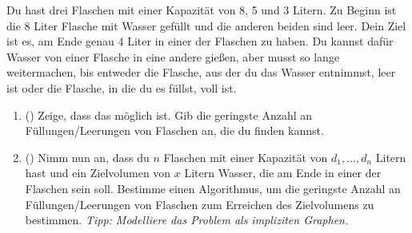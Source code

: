 \documentclass{uebung_cs}
\begin{document}
\begin{aufgabe}
Du hast drei Flaschen mit einer Kapazität von 8, 5 und 3 Litern.
Zu Beginn ist die 8 Liter Flasche mit Wasser gefüllt und die anderen beiden sind leer.
Dein Ziel ist es, am Ende genau 4 Liter in einer der Flaschen zu haben. Du kannst dafür Wasser von einer Flasche in eine andere gießen, aber musst so lange weitermachen, bis entweder die Flasche, aus der du das Wasser entnimmst, leer ist oder die Flasche, in die du es füllst, voll ist.
\begin{enumerate}
	\item (\hard) Zeige, dass das möglich ist. Gib die geringste Anzahl an Füllungen/Leerungen von Flaschen an, die du finden kannst.
	\item (\hard) Nimm nun an, dass du $n$ Flaschen mit einer Kapazität von $d_1, \ldots, d_n$ Litern hast und ein Zielvolumen von $x$ Litern Wasser, die am Ende in einer der Flaschen sein soll.
	Bestimme einen Algorithmus, um die geringste Anzahl an Füllungen/Leerungen von Flaschen zum Erreichen des Zielvolumens zu bestimmen.
	\textit{Tipp: Modelliere das Problem als impliziten Graphen.}
\end{enumerate}
\end{aufgabe}
\end{document}
